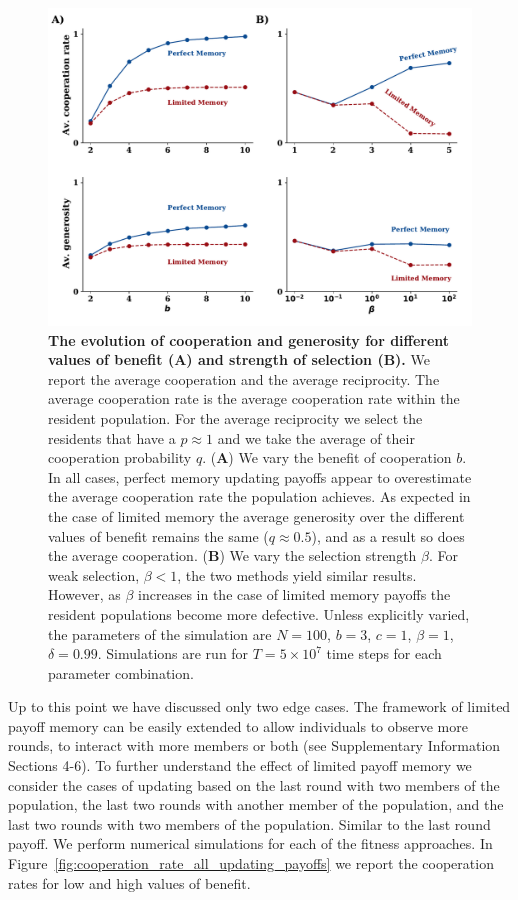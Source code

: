 \documentclass[11pt]{article}
\theoremstyle{plainCl1}
\theoremstyle{plainCl2}
\begin{document}
\begin{figure}[!htbp]
    \centering
    \includegraphics[width=.75\textwidth]{static/cooperation_rate_over_b_and_beta.pdf}
    \caption{{\bf The evolution of cooperation and generosity for different
    values of benefit (A) and strength of selection (B).} We report the average
    cooperation and the average reciprocity. The average cooperation rate is the
    average cooperation rate within the resident population. For the average
    reciprocity we select the residents that have a $p \approx 1$ and we take
    the average of their cooperation probability $q$. ({\bf A}) We vary the
    benefit of cooperation $b$. In all cases, perfect memory updating payoffs
    appear to overestimate the average cooperation rate the population achieves.
    As expected in the case of limited memory the average generosity over the
    different values of benefit remains the same ($q \approx 0.5$), and as a
    result so does the average cooperation. ({\bf B}) We vary the selection
    strength $\beta$. For weak selection, \(\beta < 1\), the two methods yield
    similar results. However, as \(\beta\) increases in the case of limited
    memory payoffs the resident populations become more defective. Unless
    explicitly varied, the parameters of the simulation are $N\!=\!100$,
    $b\!=\!3$, $c\!=\!1$, $\beta\!=\!1$, $\delta\!=\!0.99$. Simulations are run
    for $T\!=\!5\times 10^7$ time steps for each parameter
    combination.}\label{fig:cooperation_rate_over_benefit_and_beta}
\end{figure}

Up to this point we have discussed only two edge cases. The framework of limited
payoff memory can be easily extended to allow individuals to observe more
rounds, to interact with more members or both (see Supplementary Information
Sections 4-6). To further understand the effect of limited payoff memory we
consider the cases of updating based on the last round with two members of the
population, the last two rounds with another member of the population, and the
last two rounds with two members of the population. Similar to the last round
payoff. We perform numerical simulations for each of the fitness approaches. In
Figure~\ref{fig:cooperation_rate_all_updating_payoffs} we report the cooperation
rates for low and high values of benefit.
\end{document}
